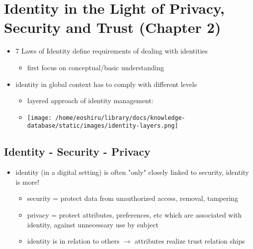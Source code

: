 \documentclass[11pt]{article}
\begin{document}
\section{Identity in the Light of Privacy, Security and Trust (Chapter 2)}
\label{sec:orgd822daf}
\begin{itemize}
\item 7 Laws of Identity define requirements of dealing with identities
\begin{itemize}
\item first focus on conceptual/basic understanding
\end{itemize}
\item identity in global context has to comply with different levels
\begin{itemize}
\item layered approach of identity management:
\item \begin{center}
\texttt{[image: /home/eoshiru/library/docs/knowledge-database/static/images/identity-layers.png]}
\end{center}
\end{itemize}
\end{itemize}
\subsection{Identity - Security - Privacy}
\label{sec:org179f50b}
\begin{itemize}
\item identity (in a digital setting) is often "only" closely linked to security, identity is more!
\begin{itemize}
\item security = protect data from unauthorized access, removal, tampering
\item privacy = protect attributes, preferences, etc which are associated with identity, against unnecessary use by subject
\item identity is in relation to others \(\rightarrow\) attributes realize trust relation ships
\end{itemize}
\end{itemize}
\end{document}
